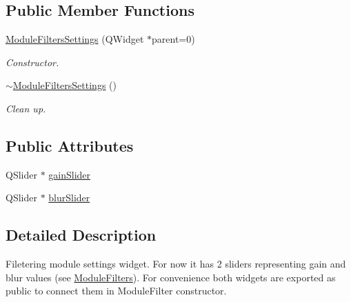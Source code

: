 \subsection*{Public Member Functions}
\begin{DoxyCompactItemize}
\item 
\hyperlink{class_module_filters_settings_ad164d73bb3766055d0b5f62cb4c71a57}{ModuleFiltersSettings} (QWidget $\ast$parent=0)
\begin{DoxyCompactList}\small\item\em Constructor. \item\end{DoxyCompactList}\item 
\hypertarget{class_module_filters_settings_ad8ab097b44b16c211c4192efcca8d572}{
\hyperlink{class_module_filters_settings_ad8ab097b44b16c211c4192efcca8d572}{$\sim$ModuleFiltersSettings} ()}
\label{d0/d0f/class_module_filters_settings_ad8ab097b44b16c211c4192efcca8d572}

\begin{DoxyCompactList}\small\item\em Clean up. \item\end{DoxyCompactList}\end{DoxyCompactItemize}
\subsection*{Public Attributes}
\begin{DoxyCompactItemize}
\item 
QSlider $\ast$ \hyperlink{class_module_filters_settings_a425c0cc194cce8d531b90f9b412103c8}{gainSlider}
\item 
QSlider $\ast$ \hyperlink{class_module_filters_settings_aab9bcceada6a0e1fa3766ec48986caff}{blurSlider}
\end{DoxyCompactItemize}


\subsection{Detailed Description}
Filetering module settings widget. For now it has 2 sliders representing gain and blur values (see \hyperlink{class_module_filters}{ModuleFilters}). For convenience both widgets are exported as public to connect them in ModuleFilter constructor. 

